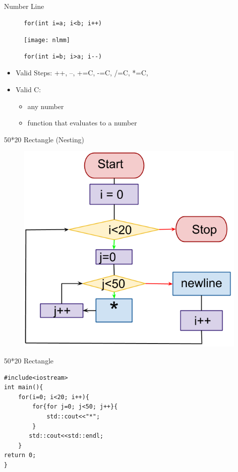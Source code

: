 \documentclass[xcolor={dvipsnames}]{beamer}
\begin{document}
\begin{frame}[fragile]{Number Line}
\Large
\begin{figure}
	\begin{verbatim}
for(int i=a; i<b; i++)
	\end{verbatim}
	\texttt{[image: nlmm]}
	\begin{verbatim}
for(int i=b; i>a; i--)
	\end{verbatim}
\end{figure}
\pause
\begin{center}
	\begin{itemize}
	\item Valid Steps: ++, --, +=C, -=C, /=C, *=C,
	\item Valid C:
		\begin{itemize} 
		\item any number
		\item function that evaluates to a number 
		\end{itemize}
	\end{itemize}
\end{center}

\end{frame}


\begin{frame}{50*20 Rectangle (Nesting)}
\begin{figure}
		\includegraphics[width=.75\textwidth]{for_nest_line}
	\end{figure}
\end{frame}

\begin{frame}[fragile]{50*20 Rectangle}
\LARGE
\begin{verbatim}
#include<iostream>
int main(){
    for(i=0; i<20; i++){
        for{for j=0; j<50; j++}{
            std::cout<<"*";
        }
       std::cout<<std::endl;
    }
return 0;
}
\end{verbatim}
\end{frame}
\end{document}
